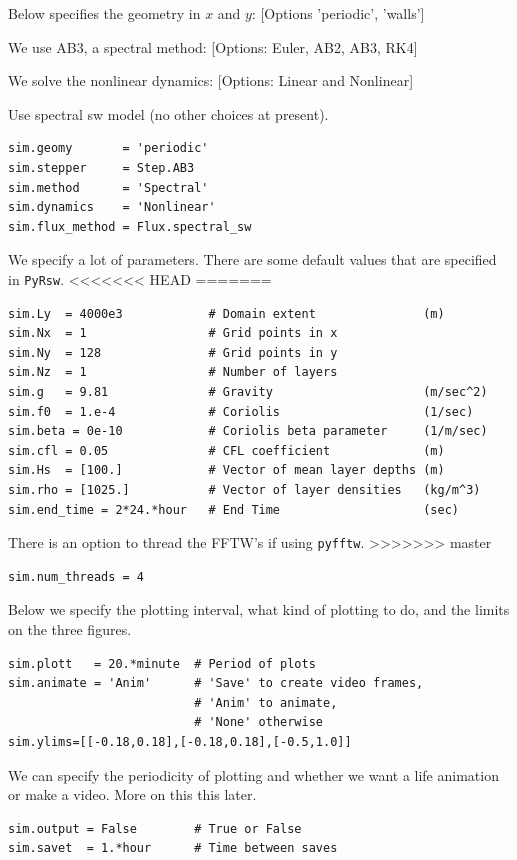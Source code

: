 \documentclass[11pt]{article}
\begin{document}
\noindent  Below specifies the geometry in $x$ and $y$: [Options 'periodic', 'walls']

\noindent We use AB3, a spectral method: [Options: Euler, AB2, AB3, RK4]

\noindent We solve the nonlinear dynamics: [Options: Linear and Nonlinear]

\noindent  Use spectral sw model (no other choices at present).  

\begin{lstlisting}
sim.geomy       = 'periodic'
sim.stepper     = Step.AB3       
sim.method      = 'Spectral'       
sim.dynamics    = 'Nonlinear'    
sim.flux_method = Flux.spectral_sw
\end{lstlisting}

We specify a lot of parameters.  There are some default values that are specified in {\tt PyRsw}.
<<<<<<< HEAD
=======
\begin{lstlisting}
sim.Ly  = 4000e3            # Domain extent               (m)
sim.Nx  = 1                 # Grid points in x
sim.Ny  = 128               # Grid points in y
sim.Nz  = 1                 # Number of layers
sim.g   = 9.81              # Gravity                     (m/sec^2)
sim.f0  = 1.e-4             # Coriolis                    (1/sec)
sim.beta = 0e-10            # Coriolis beta parameter     (1/m/sec)
sim.cfl = 0.05              # CFL coefficient             (m)
sim.Hs  = [100.]            # Vector of mean layer depths (m)
sim.rho = [1025.]           # Vector of layer densities   (kg/m^3)
sim.end_time = 2*24.*hour   # End Time                    (sec)
\end{lstlisting}

There is an option to thread the FFTW's if using {\tt pyfftw}.
>>>>>>> master
\begin{lstlisting}
sim.num_threads = 4
\end{lstlisting}

Below we specify the plotting interval, what kind of plotting to do, and the limits on the three figures.
\begin{lstlisting}
sim.plott   = 20.*minute  # Period of plots
sim.animate = 'Anim'      # 'Save' to create video frames,
                          # 'Anim' to animate,
                          # 'None' otherwise
sim.ylims=[[-0.18,0.18],[-0.18,0.18],[-0.5,1.0]]
\end{lstlisting}

We can specify the periodicity of plotting and whether we want a life animation or make a video.  More on this this later.
\begin{lstlisting}
sim.output = False        # True or False
sim.savet  = 1.*hour      # Time between saves
\end{lstlisting}
\end{document}
